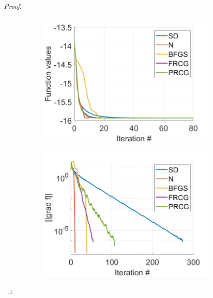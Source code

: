\documentclass[12pt]{report}
\begin{document}
\begin{problem}
\begin{proof}
        \begin{figure}[H]
            \begin{subfigure}[b]{0.5\linewidth}
                \centering
                \includegraphics[width=\linewidth]{images/2-funcval.png}
                \caption{}
                \label{fig2:a}
                \vspace{4ex}
            \end{subfigure}%
            \begin{subfigure}[b]{0.5\linewidth}
                \centering
                \includegraphics[width=\linewidth]{images/2-gradf.png}
                \caption{}
                \label{fig2:b}
                \vspace{4ex}

\end{subfigure}
\end{figure}
\end{proof}
\end{problem}
\end{document}
